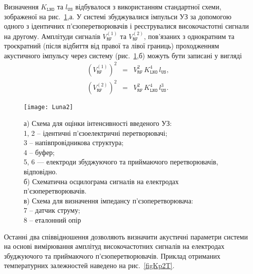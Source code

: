 Визначення $K_\mathtt{LNO}$ та $l_\mathtt{US}$ відбувалося з використанням стандартної схеми,
зображеної на рис.~\ref{Luna2},а.
У системі збуджувалися імпульси УЗ за допомогою одного з ідентичних п'єзоперетворювачів і реєструвалися
високочастотні сигнали на другому.
Амплітуди сигналів $V_\mathtt{RF}^{(1)}$ та $V_\mathtt{RF}^{(2)}$, пов'язаних з однократним та троєкратний (після відбиття від правої та лівої границь) проходженням акустичного імпульсу через систему
(рис.~\ref{Luna2},б) можуть бути записані у вигляді
\begin{eqnarray}
  \label{eqVrf1} (V_\mathtt{RF}^{(1)})^2&=&V_\mathtt{RF}^2\,K_\mathtt{LNO}^4\,l_\mathtt{US}, \\
  \label{eqVrf2} (V_\mathtt{RF}^{(2)})^2&=&V_\mathtt{RF}^2\,K_\mathtt{LNO}^4\,l_\mathtt{US}^3.
\end{eqnarray}


\begin{figure}
\center
\texttt{[image: Luna2]}%
\caption{\label{Luna2}
а) Схема для оцінки інтенсивності введеного УЗ:\protect\\
1, 2 -- ідентичні п'єзоелектричні перетворювачі; \protect\\
3 -- напівпровідникова структура;\protect\\
4 -- буфер; \protect\\
5, 6 --- електроди збуджуючого та приймаючого перетворювачів, відповідно. \protect\\
б) Схематична осцилограма сигналів на електродах п'єзоперетворювачів. \protect\\
в) Схема для визначення імпедансу п'єзоперетворювача: \protect\\
7 -- датчик струму; \protect\\
8 -- еталонний опір
}
\end{figure}

Останні два співвідношення дозволяють визначити акустичні параметри системи на основі вимірювання амплітуд
високочастотних сигналів на електродах збуджуючого та приймаючого п'єзоперетворювачів.
Приклад отриманих температурних залежностей наведено на рис.~\ref{figKp2T}.

